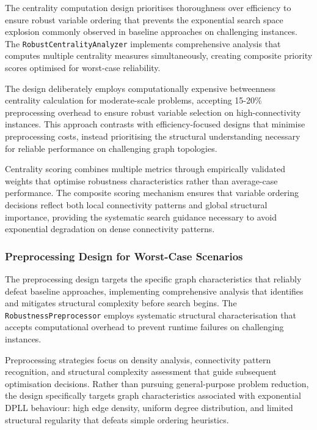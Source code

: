The centrality computation design prioritises thoroughness over efficiency to ensure robust variable ordering that prevents the exponential search space explosion commonly observed in baseline approaches on challenging instances. The \texttt{RobustCentrality\-Analyzer} implements comprehensive analysis that computes multiple centrality measures simultaneously, creating composite priority scores optimised for worst-case reliability.

The design deliberately employs computationally expensive betweenness centrality calculation for moderate-scale problems, accepting 15-20\% preprocessing overhead to ensure robust variable selection on high-connectivity instances. This approach contrasts with efficiency-focused designs that minimise preprocessing costs, instead prioritising the structural understanding necessary for reliable performance on challenging graph topologies.

Centrality scoring combines multiple metrics through empirically validated weights that optimise robustness characteristics rather than average-case performance. The composite scoring mechanism ensures that variable ordering decisions reflect both local connectivity patterns and global structural importance, providing the systematic search guidance necessary to avoid exponential degradation on dense connectivity patterns.

\subsubsection{Preprocessing Design for Worst-Case Scenarios}

The preprocessing design targets the specific graph characteristics that reliably defeat baseline approaches, implementing comprehensive analysis that identifies and mitigates structural complexity before search begins. The \texttt{RobustnessPreprocessor} employs systematic structural characterisation that accepts computational overhead to prevent runtime failures on challenging instances.

Preprocessing strategies focus on density analysis, connectivity pattern recognition, and structural complexity assessment that guide subsequent optimisation decisions. Rather than pursuing general-purpose problem reduction, the design specifically targets graph characteristics associated with exponential DPLL behaviour: high edge density, uniform degree distribution, and limited structural regularity that defeats simple ordering heuristics.

